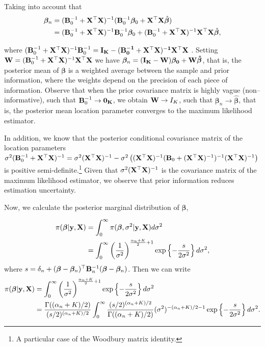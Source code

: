 Taking into account that 
\begin{align*}\bm{\beta}_n & = ({\bf{B}}_0^{-1} + {\bf{X}}^{\top}{\bf{X}})^{-1}({\bf{B}}_0^{-1}\bm{\beta}_0 + {\bf{X}}^{\top}{\bf{X}}\hat{\bm{\beta}})\\
	& = ({\bf{B}}_0^{-1} + {\bf{X}}^{\top}{\bf{X}})^{-1}{\bf{B}}_0^{-1}\bm{\beta}_0 + ({\bf{B}}_0^{-1} + {\bf{X}}^{\top}{\bf{X}})^{-1} {\bf{X}}^{\top}{\bf{X}}\hat{\bm{\beta}}, 
\end{align*}

where $({\bf{B}}_0^{-1} + {\bf{X}}^{\top}{\bf{X}})^{-1}{\bf{B}}_0^{-1}=\bf{I}_K-({\bf{B}}_0^{-1} + {\bf{X}}^{\top}{\bf{X}})^{-1}{\bf{X}}^{\top}{\bf{X}}$ \cite{Smith1973}. Setting ${\bf{W}}=({\bf{B}}_0^{-1} + {\bf{X}}^{\top}{\bf{X}})^{-1}{\bf{X}}^{\top}{\bf{X}}$ we have $\bm{\beta}_n=(\bf{I}_K-{\bf{W}})\bm{\beta}_0+{\bf{W}}\hat{\bm{\beta}}$, that is, the posterior mean of $\bm{\beta}$ is a weighted average between the sample and prior information, where the weights depend on the precision of each piece of information. Observe that when the prior covariance matrix is highly vague (non--informative), such that ${\bf{B}}_0^{-1}\rightarrow \bf{0}_K$, we obtain ${\bf{W}} \rightarrow I_K$, such that $\bm{\beta}_n \rightarrow \hat{\bm{\beta}}$, that is, the posterior mean location parameter converges to the maximum likelihood estimator.

In addition, we know that the posterior conditional covariance matrix of the location parameters $\sigma^2({\bf{B}}_0^{-1} + {\bf{X}}^{\top}{\bf{X}})^{-1}=\sigma^2({\bf{X}}^{\top}{\bf{X}})^{-1}-\sigma^2\left(({\bf{X}}^{\top}{\bf{X}})^{-1}({\bf{B}}_0 + ({\bf{X}}^{\top}{\bf{X}})^{-1})^{-1}({\bf{X}}^{\top}{\bf{X}})^{-1}\right)$ is positive semi-definite.\footnote{A particular case of the Woodbury matrix identity.} Given that $\sigma^2({\bf{X}}^{\top}{\bf{X}})^{-1}$ is the covariance matrix of the maximum likelihood estimator, we observe that prior information reduces estimation uncertainty.

Now, we calculate the posterior marginal distribution of $\bm{\beta}$,

\begin{align*}
	\pi(\bm{\beta}|{\bf{y}},{\bf{X}}) & = \int_0^{\infty} \pi(\bm{\beta}, \sigma^2|{\bf{y}},{\bf{X}}) d\sigma^2 \\
	& = \int_0^{\infty} \left(\frac{1}{\sigma^2}\right)^{\frac{\alpha_n+K}{2} + 1} \exp \left\{-\frac{s}{2\sigma^2}\right\} d\sigma^2,
\end{align*}
where $s = \delta_n + (\bm{\beta} - \bm{\beta}_n)^{\top}{{\bf{B}}}_n^{-1}(\bm{\beta} - \bm{\beta}_n)$. Then we can write
\begin{align*}
	\pi(\bm{\beta}|{\bf{y}},{\bf{X}}) & = \int_0^{\infty} \left(\frac{1}{\sigma^2}\right)^{\frac{\alpha_n+K}{2} + 1} \exp \left\{-\frac{s}{2\sigma^2}\right\} d\sigma^2 \\
	& = \frac{\Gamma((\alpha_n+K)/2)}{(s/2)^{(\alpha_n+K)/2}} \int_0^{\infty} \frac{(s/2)^{(\alpha_n+K)/2}}{\Gamma((\alpha_n+K)/2)} (\sigma^2)^{-(\alpha_n+K)/2 - 1} \exp \left\{-\frac{s}{2\sigma^2}\right\} d\sigma^2.
\end{align*}

